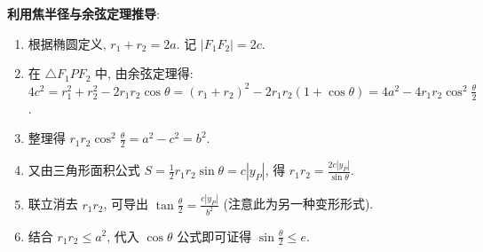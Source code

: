 \begin{proofbox}
\textbf{利用焦半径与余弦定理推导}:
\begin{enumerate}
    \item 根据椭圆定义, $r_1 + r_2 = 2a$. 记 $|F_1F_2| = 2c$.
    \item 在 $\triangle F_1PF_2$ 中, 由余弦定理得:
    $4c^2 = r_1^2 + r_2^2 - 2r_1r_2\cos\theta = (r_1+r_2)^2 - 2r_1r_2(1+\cos\theta) = 4a^2 - 4r_1r_2\cos^2\frac{\theta}{2}$.
    \item 整理得 $r_1r_2\cos^2\frac{\theta}{2} = a^2 - c^2 = b^2$.
    \item 又由三角形面积公式 $S = \frac{1}{2}r_1r_2\sin\theta = c|y_P|$, 得 $r_1r_2 = \frac{2c|y_P|}{\sin\theta}$.
    \item 联立消去 $r_1r_2$, 可导出 $\tan\frac{\theta}{2} = \frac{c|y_P|}{b^2}$ (注意此为另一种变形形式).
    \item 结合 $r_1r_2 \le a^2$, 代入 $\cos\theta$ 公式即可证得 $\sin\frac{\theta}{2} \le e$.
\end{enumerate}
\end{proofbox}